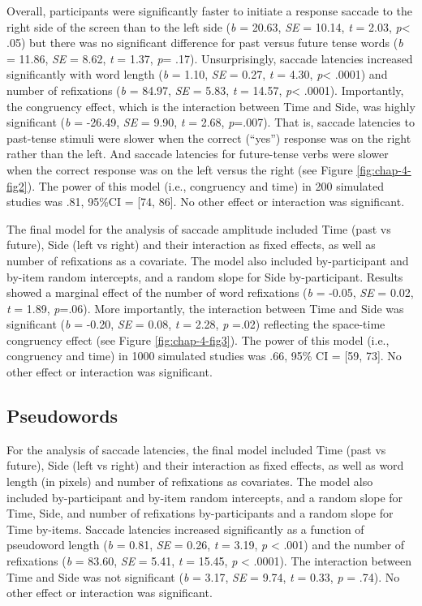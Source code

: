 \documentclass[
  a4paper,12pt,twoside,onecolumn,openright,final,oldfontcommands]{memoir}
\begin{document}
Overall, participants were significantly faster to initiate a response saccade to the right side of the screen than to the left side (\emph{b} = 20.63, \emph{SE} = 10.14, \emph{t} = 2.03, \emph{p}\textless{} .05) but there was no significant difference for past versus future tense words (\emph{b} = 11.86, \emph{SE} = 8.62, \emph{t} = 1.37, \emph{p}= .17). Unsurprisingly, saccade latencies increased significantly with word length (\emph{b} = 1.10, \emph{SE} = 0.27, \emph{t} = 4.30, \emph{p}\textless{} .0001) and number of refixations (\emph{b} = 84.97, \emph{SE} = 5.83, \emph{t} = 14.57, \emph{p}\textless{} .0001). Importantly, the congruency effect, which is the interaction between Time and Side, was highly significant (\emph{b} = -26.49, \emph{SE} = 9.90, \emph{t} = 2.68, \emph{p}=.007). That is, saccade latencies to past-tense stimuli were slower when the correct (``yes'') response was on the right rather than the left. And saccade latencies for future-tense verbs were slower when the correct response was on the left versus the right (see Figure \ref{fig:chap-4-fig2}). The power of this model (i.e., congruency and time) in 200 simulated studies was .81, 95\%CI = {[}74, 86{]}. No other effect or interaction was significant.

The final model for the analysis of saccade amplitude included Time (past vs future), Side (left vs right) and their interaction as fixed effects, as well as number of refixations as a covariate. The model also included by-participant and by-item random intercepts, and a random slope for Side by-participant. Results showed a marginal effect of the number of word refixations (\emph{b} = -0.05, \emph{SE} = 0.02, \emph{t} = 1.89, \emph{p}=.06). More importantly, the interaction between Time and Side was significant (\emph{b} = -0.20, \emph{SE} = 0.08, \emph{t} = 2.28, \emph{p} =.02) reflecting the space-time congruency effect (see Figure \ref{fig:chap-4-fig3}). The power of this model (i.e., congruency and time) in 1000 simulated studies was .66, 95\% CI = {[}59, 73{]}. No other effect or interaction was significant.

\hypertarget{pseudowords-3}{%
\subsection{Pseudowords}\label{pseudowords-3}}

For the analysis of saccade latencies, the final model included Time (past vs future), Side (left vs right) and their interaction as fixed effects, as well as word length (in pixels) and number of refixations as covariates. The model also included by-participant and by-item random intercepts, and a random slope for Time, Side, and number of refixations by-participants and a random slope for Time by-items. Saccade latencies increased significantly as a function of pseudoword length (\emph{b} = 0.81, \emph{SE} = 0.26, \emph{t} = 3.19, \emph{p} \textless{} .001) and the number of refixations (\emph{b} = 83.60, \emph{SE} = 5.41, \emph{t} = 15.45, \emph{p} \textless{} .0001). The interaction between Time and Side was not significant (\emph{b} = 3.17, \emph{SE} = 9.74, \emph{t} = 0.33, \emph{p} = .74). No other effect or interaction was significant.
\end{document}
